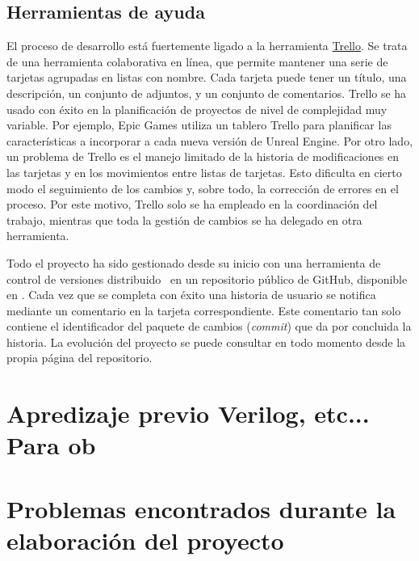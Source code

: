 \subsection{Herramientas de ayuda}
El proceso de desarrollo está fuertemente ligado a la herramienta \href{https://trello.com/}{Trello}. Se trata de una herramienta colaborativa en línea, que permite mantener una serie de tarjetas agrupadas en listas con nombre. Cada tarjeta puede tener un título, una descripción, un conjunto de adjuntos, y un conjunto de comentarios. Trello se ha usado con éxito en la planificación de proyectos de nivel de complejidad muy variable. Por ejemplo, Epic Games utiliza un tablero Trello para planificar las características a incorporar a cada nueva versión de Unreal Engine. Por otro lado, un problema de Trello es el manejo limitado de la historia de modificaciones en las tarjetas y en los movimientos entre listas de tarjetas. Esto dificulta en cierto modo el seguimiento de los cambios y, sobre todo, la corrección de errores en el proceso. Por este motivo, Trello solo se ha empleado en la coordinación del trabajo, mientras que toda la gestión de cambios se ha delegado en otra herramienta.

Todo el proyecto ha sido gestionado desde su inicio con una herramienta de control de versiones distribuido~\cite{scottchaconbenstraub2018} en un repositorio público de GitHub, disponible en \thegitrepo. Cada vez que se completa con éxito una historia de usuario se notifica mediante un comentario en la tarjeta correspondiente. Este comentario tan solo contiene el identificador del paquete de cambios (\emph{commit}) que da por concluida la historia. La evolución del proyecto se puede consultar  en todo momento desde la propia página del repositorio.


\section{Apredizaje previo Verilog, etc...
Para ob \cite{obijuan:tutorial-fpga}}


\section{Problemas encontrados durante la elaboración del proyecto}



